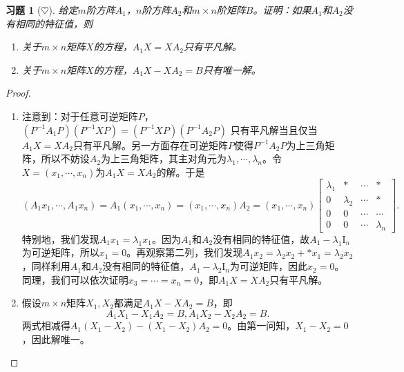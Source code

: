 \documentclass[UTF8]{ctexart}
\newtheorem{ex}[thm]{习题}
\begin{document}
\begin{ex}[$\heartsuit $]
给定$m$阶方阵$A_1$，$n$阶方阵$A_2$和$m \times n$阶矩阵$B$。证明：如果$A_1$和$A_2$没有相同的特征值，则
\begin{enumerate}
\item
关于$m \times n$矩阵$X$的方程，$A_1X = XA_2$只有平凡解。
\item
关于$m \times n$矩阵$X$的方程，$A_1X - XA_2 = B$只有唯一解。
\end{enumerate}
\end{ex}
\begin{proof}
\begin{enumerate}
\item
注意到：对于任意可逆矩阵$P$，$(P^{-1}A_1P)(P^{-1}XP) = (P^{-1}XP)(P^{-1}A_2P)$
只有平凡解当且仅当$A_1X = XA_2$只有平凡解。另一方面存在可逆矩阵$P$使得$P^{-1}A_2P$为上三角矩阵，所以不妨设$A_2$为上三角矩阵，其主对角元为$\lambda_1, \cdots, \lambda_n$。令$X = (x_1, \cdots, x_n)$为$A_1X = XA_2$的解。于是
\[
(A_1x_1, \cdots, A_1x_n) = A_1(x_1, \cdots, x_n) = (x_1, \cdots, x_n) A_2 =  (x_1, \cdots, x_n) \begin{bmatrix}
\lambda_1 & * & \cdots & * \\
0 & \lambda_2 & \cdots & * \\
0 & 0 & \cdots & \cdots \\
0 & 0 &  \cdots & \lambda_n
\end{bmatrix}.
\]
特别地，我们发现$A_1x_1 = \lambda_1 x_1$。因为$A_1$和$A_2$没有相同的特征值，故$A_1 - \lambda_1 \mathrm{I}_n$为可逆矩阵，所以$x_1 = 0$。再观察第二列，我们发现$A_1x_2 = \lambda_2 x_2 + * x_1 = \lambda_2 x_2$，同样利用$A_1$和$A_2$没有相同的特征值，$A_1 - \lambda_2 \mathrm{I}_n$为可逆矩阵，因此$x_2 = 0$。同理，我们可以依次证明$x_3 = \cdots = x_n = 0$，即$A_1X = XA_2$只有平凡解。
\item
假设$m \times n$矩阵$X_1, X_2$都满足$A_1X - XA_2 = B$，即
\[
A_1X_1 - X_1A_2 = B, A_1X_2 - X_2A_2 = B. 
\]
两式相减得$A_1(X_1-X_2) - (X_1-X_2)A_2 = 0$。由第一问知，$X_1-X_2 = 0$，因此解唯一。

\end{enumerate}
\end{proof}
\end{document}
